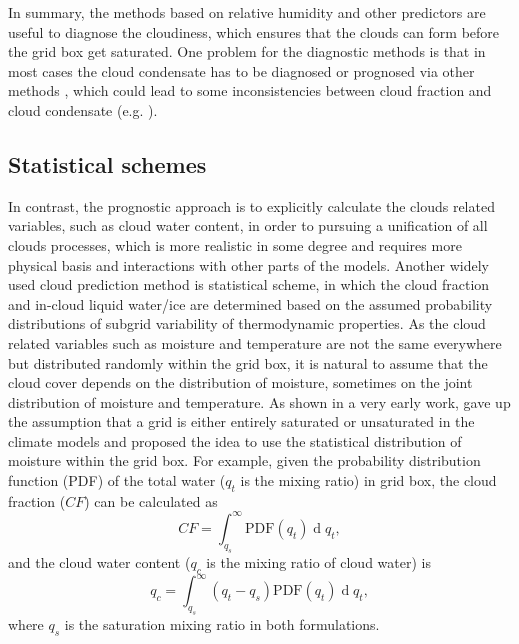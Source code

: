 In summary, the methods based on relative humidity and other predictors are useful to diagnose the cloudiness, which ensures that the clouds can form before the grid box get saturated. One problem for the diagnostic methods is that in most cases the cloud condensate has to be diagnosed or prognosed via other methods \citep[e.g.,][]{Zhang2003, Park2014}, which could lead to some inconsistencies between cloud fraction and cloud condensate (e.g. \citealp{Gregory2002, Tompkins2005}).



\subsection{Statistical schemes}
\label{sec:PDF_cld_scheme}

In contrast, the prognostic approach \citep[e.g.,][]{Tiedtke1993} is to explicitly calculate the clouds related variables, such as cloud water content, in order to pursuing a unification of all clouds processes, which is more realistic in some degree and requires more physical basis and interactions with other parts of the models. Another widely used cloud prediction method is statistical scheme, in which the cloud fraction and in-cloud liquid water/ice are determined based on the assumed probability distributions of subgrid variability of thermodynamic properties. As the cloud related variables such as moisture and temperature are not the same everywhere but distributed randomly within the grid box, it is natural to assume that the cloud cover depends on the distribution of moisture, sometimes on the joint distribution of moisture and temperature. As shown in a very early work, \cite{Sommeria1977} gave up the assumption that a grid is either entirely saturated or unsaturated in the climate models and proposed the idea to use the statistical distribution of moisture within the grid box. For example, given the probability distribution function (PDF) of the total water ($q_t$ is the mixing ratio) in grid box, the cloud fraction ($CF$) can be calculated as 
\begin{equation}
    CF=\int_{q_s}^{\infty}\text{PDF}(q_t)\operatorname{d}q_t,
\end{equation}
and the cloud water content ($q_c$ is the mixing ratio of cloud water) is
\begin{equation}
    q_c=\int_{q_s}^{\infty}(q_t-q_s)\text{PDF}(q_t)\operatorname{d}q_t,
\end{equation}
where $q_s$ is the saturation mixing ratio in both formulations.

